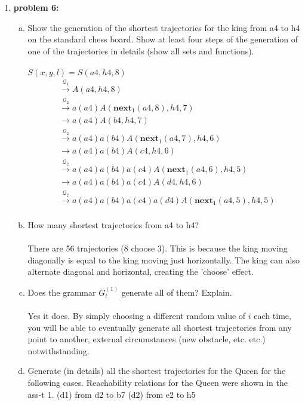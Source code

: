 \documentclass[11pt]{article}
\begin{document}
\begin{enumerate}
\item \textbf{problem 6:}
\begin{enumerate}[(a)]
\item Show the generation of the shortest trajectories for the king from a4 to h4 on the standard chess board. Show at least four steps of the generation of one of the trajectories in details (show all sets and functions). \\\\
$S(x,y,l) = S(a4, h4, 8)$
\begin{align*}
&\overset{\mathcal{Q}_1}{\rightarrow} A(a4, h4, 8)\\
&\overset{\mathcal{Q}_2}{\rightarrow} a(a4)A(\textbf{next}_1 (a4, 8), h4, 7)\\
&\rightarrow a(a4)A(b4, h4, 7)\\
&\overset{\mathcal{Q}_2}{\rightarrow} a(a4)a(b4)A(\textbf{next}_1 (a4, 7), h4, 6)\\
&\rightarrow a(a4)a(b4)A(c4, h4, 6)\\
&\overset{\mathcal{Q}_2}{\rightarrow} a(a4)a(b4)a(c4)A(\textbf{next}_1 (a4, 6), h4, 5)\\
&\rightarrow a(a4)a(b4)a(c4)A(d4, h4, 6)\\
&\overset{\mathcal{Q}_2}{\rightarrow}a(a4)a(b4)a(c4)a(d4)A(\textbf{next}_1 (a4, 5), h4, 5)\\
\end{align*}
\item How many shortest trajectories from a4 to h4? \\\\
There are 56 trajectories (8 choose 3). This is because the king moving diagonally is equal to the king moving just horizontally. The king can also alternate diagonal and horizontal, creating the 'choose' effect. 
\item Does the grammar $G_t^(1)$ generate all of them? Explain. \\\\
Yes it does. By simply choosing a different random value of $i$ each time, you will be able to eventually generate all shortest trajectories from any point to another, external circumstances (new obstacle, etc. etc.) notwithstanding. 
\item Generate (in details) all the shortest trajectories for the Queen for the following cases. Reachability relations for the Queen were shown in the ass-t 1. (d1) from d2 to b7 (d2) from e2 to h5
\end{enumerate}

\end{enumerate}
\end{document}
